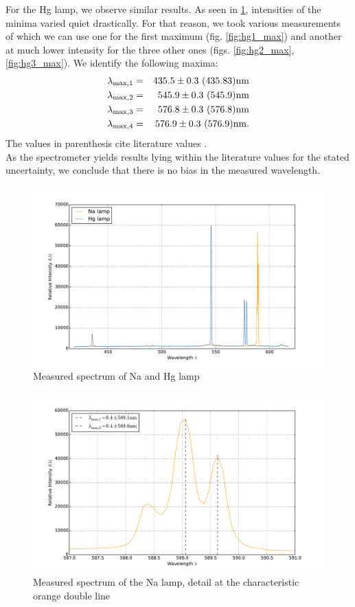 For the Hg lamp, we observe similar results. As seen in \ref{fig:spectrum_all}, intensities 
of the minima varied quiet drastically. For that reason, we took various measurements of which 
we can use one for the first maximum (fig. \ref{fig:hg1_max}) and another at much lower 
intensity for the three other ones (figs. \ref{fig:hg2_max}, \ref{fig:hg3_max}). 
We identify the following maxima:
\begin{eqnarray*}
    \lambda_\mathrm{max, 1} &=& 435.5 \pm 0.3 \ (435.83)\mathrm{nm} \\
    \lambda_\mathrm{max, 2} &=& 545.9 \pm 0.3 \ (545.9)\mathrm{nm} \\
    \lambda_\mathrm{max, 3} &=& 576.8 \pm 0.3 \ (576.8)\mathrm{nm} \\
    \lambda_\mathrm{max, 4} &=& 576.9 \pm 0.3 \ (576.9)\mathrm{nm}.
\end{eqnarray*}
The values in parenthesis cite literature values \cite{}. \\
As the spectrometer yields results lying within the literature values for the 
stated uncertainty, we conclude that there is no bias in the measured wavelength.

\begin{figure}
\centering
\includegraphics[width=\pltw]{analysis/figures/spectrum_all.pdf}
\caption{Measured spectrum of Na and Hg lamp}
\label{fig:spectrum_all}
\end{figure}

\begin{figure}
\centering
\includegraphics[width=\pltw]{analysis/figures/na_max.pdf}
\caption{Measured spectrum of the Na lamp, detail at the 
characteristic orange double line}
\label{fig:na_max}
\end{figure}

